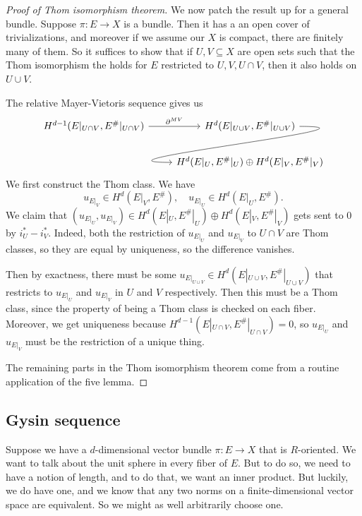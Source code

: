 \documentclass[a4paper]{article}
\begin{document}
\begin{proof}[Proof of Thom isomorphism theorem]
  \separator

  We now patch the result up for a general bundle. Suppose $\pi: E \to X$ is a bundle. Then it has a an open cover of trivializations, and moreover if we assume our $X$ is compact, there are finitely many of them. So it suffices to show that if $U, V \subseteq X$ are open sets such that the Thom isomorphism the holds for $E$ restricted to $U, V, U \cap V$, then it also holds on $U \cup V$.

  The relative Mayer-Vietoris sequence gives us
  \[
    \begin{tikzcd}
      H^{d - 1}(E|_{U \cap V}, E^\#|_{U \cap V}) \ar[r, "\partial^{MV}"] & H^d(E|_{U\cup V}, E^\#|_{U\cup V}) \ar[out=0, in=180, looseness=2, overlay, d]\\
      & H^d(E|_U, E^\#|_U) \oplus H^d(E|_V, E^\#|_V) %
    \end{tikzcd}
  \]
  We first construct the Thom class. We have
  \[
    u_{E|_V} \in H^d(E|_V, E^\#),\quad u_{E|_U} \in H^d(E|_U, E^\#).
  \]
  We claim that $(u_{E|_U}, u_{E|_V}) \in H^d(E|_U, E^\#|_U) \oplus H^d(E|_V, E^\#|_V)$ gets sent to $0$ by $i_U^* - i_V^*$. Indeed, both the restriction of $u_{E|_U}$ and $u_{E|_V}$ to $U \cap V$ are Thom classes, so they are equal by uniqueness, so the difference vanishes.

  Then by exactness, there must be some $u_{E|_{U\cup V}} \in H^d(E|_{U \cup V}, E^\#|_{U \cup V})$ that restricts to $u_{E|_U}$ and $u_{E|_V}$ in $U$ and $V$ respectively. Then this must be a Thom class, since the property of being a Thom class is checked on each fiber. Moreover, we get uniqueness because $H^{d - 1}(E|_{U \cap V}, E^\#|_{U \cap V}) = 0$, so $u_{E|_U}$ and $u_{E|_V}$ must be the restriction of a unique thing.


  The remaining parts in the Thom isomorphism theorem come from a routine application of the five lemma.
\end{proof}

\subsection{Gysin sequence}
Suppose we have a $d$-dimensional vector bundle $\pi: E \to X$ that is $R$-oriented. We want to talk about the unit sphere in every fiber of $E$. But to do so, we need to have a notion of length, and to do that, we want an inner product. But luckily, we do have one, and we know that any two norms on a finite-dimensional vector space are equivalent. So we might as well arbitrarily choose one.
\end{document}
